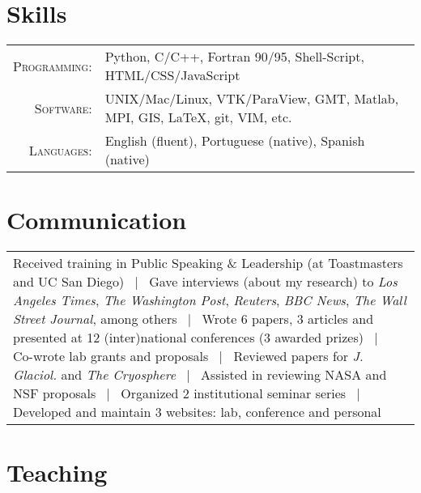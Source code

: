 \documentclass[a4paper,11pt]{article}
\begin{document}

\section{Skills}

\begin{tabular}{rp{}}
\textsc{Programming:} & Python, C/C++, Fortran 90/95, Shell-Script, HTML/CSS/JavaScript\\
\textsc{Software:} & UNIX/Mac/Linux, VTK/ParaView, GMT, Matlab, MPI, GIS, \LaTeX, git, VIM, etc.\\
\textsc{Languages:} & English (fluent), Portuguese (native), Spanish (native)
\end{tabular}


\section{Communication}

\begin{tabular}{p{\textwidth}}
Received training in Public Speaking \& Leadership (at Toastmasters and UC San Diego) ~|~ Gave interviews (about my research) to {\it Los Angeles Times}, {\it The Washington Post}, {\it Reuters}, {\it BBC News}, {\it The Wall Street Journal}, among others ~|~ Wrote 6 papers, 3 articles and presented at 12 (inter)national conferences (3 awarded prizes) ~|~ Co-wrote lab grants and proposals ~|~ Reviewed papers for {\it J. Glaciol.} and {\it The Cryosphere} ~|~ Assisted in reviewing NASA and NSF proposals ~|~ Organized 2 institutional seminar series ~|~ Developed and maintain 3 websites: lab, conference and personal
\end{tabular}


\section{Teaching}
\end{document}
